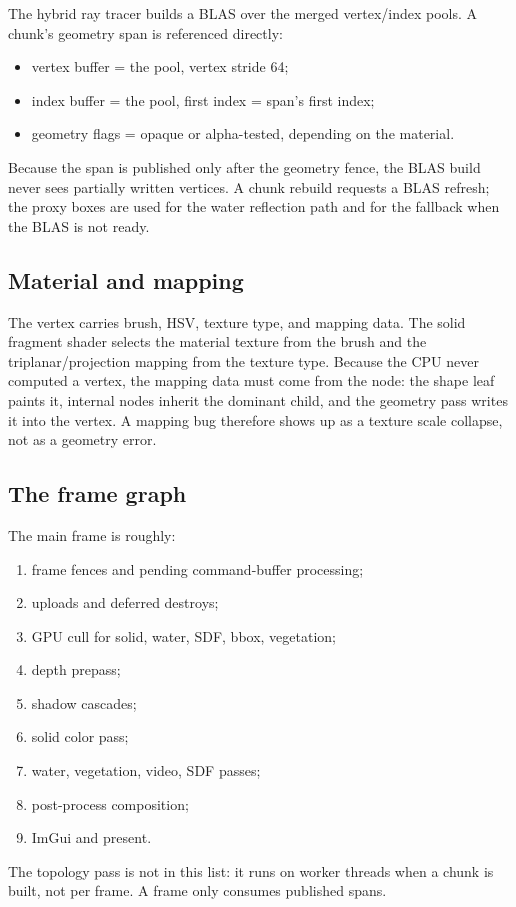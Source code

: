 The hybrid ray tracer builds a BLAS over the merged vertex/index pools.  A
chunk's geometry span is referenced directly:
\begin{itemize}
\item vertex buffer = the pool, vertex stride 64;
\item index buffer = the pool, first index = span's first index;
\item geometry flags = opaque or alpha-tested, depending on the material.
\end{itemize}
Because the span is published only after the geometry fence, the BLAS build
never sees partially written vertices.  A chunk rebuild requests a BLAS
refresh; the proxy boxes are used for the water reflection path and for
the fallback when the BLAS is not ready.

\subsection{Material and mapping}

The vertex carries brush, HSV, texture type, and mapping data.  The solid
fragment shader selects the material texture from the brush and the
triplanar/projection mapping from the texture type.  Because the CPU never
computed a vertex, the mapping data must come from the node: the shape
leaf paints it, internal nodes inherit the dominant child, and the geometry
pass writes it into the vertex.  A mapping bug therefore shows up as a texture
scale collapse, not as a geometry error.

\subsection{The frame graph}

The main frame is roughly:
\begin{enumerate}
\item frame fences and pending command-buffer processing;
\item uploads and deferred destroys;
\item GPU cull for solid, water, SDF, bbox, vegetation;
\item depth prepass;
\item shadow cascades;
\item solid color pass;
\item water, vegetation, video, SDF passes;
\item post-process composition;
\item ImGui and present.
\end{enumerate}
The topology pass is not in this list: it runs on worker threads when a
chunk is built, not per frame.  A frame only consumes published spans.
